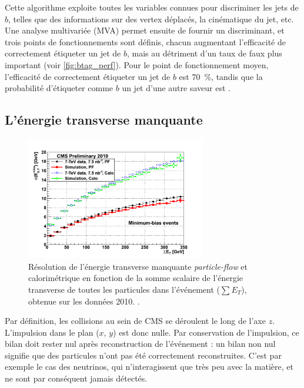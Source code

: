 Cette algorithme exploite toutes les variables connues pour discriminer les jets de $b$, telles que des informations sur des vertex déplacés, la cinématique du jet, etc. Une analyse multivariée (MVA) permet ensuite de fournir un discriminant, et trois points de fonctionnements sont définis, chacun augmentant l'efficacité de correctement étiqueter un jet de $b$, mais au détriment d'un taux de faux plus important (voir \cref{fig:btag_perf}). Pour le point de fonctionnement moyen, l'efficacité de correctement étiqueter un jet de $b$ est \tilde\SI{70}{\%}, tandis que la probabilité d'étiqueter comme $b$ un jet d'une autre saveur est .

\subsection{L'énergie transverse manquante} \label{sec:met}

\begin{figure}[tbp]
    \centering
    \includegraphics[width=0.7\textwidth]{chapitre3/figs/pf_met_resolution.png}
    \caption{Résolution de l'énergie transverse manquante \emph{particle-flow} et calorimétrique en fonction de la somme scalaire de l'énergie transverse de toutes les particules dans l'événement ($\sum E_T$), obtenue sur les données 2010. \citep{cms_pf_jets}.}
    \label{fig:met_resolution}
\end{figure}

Par définition, les collisions au sein de CMS se déroulent le long de l'axe $z$. L'impulsion dans le plan ($x$, $y$) est donc nulle. Par conservation de l'impulsion, ce bilan doit rester nul après reconstruction de l'événement : un bilan non nul signifie que des particules n'ont pas été correctement reconstruites. C'est par exemple le cas des neutrinos, qui n'interagissent que très peu avec la matière, et ne sont par conséquent jamais détectés.

